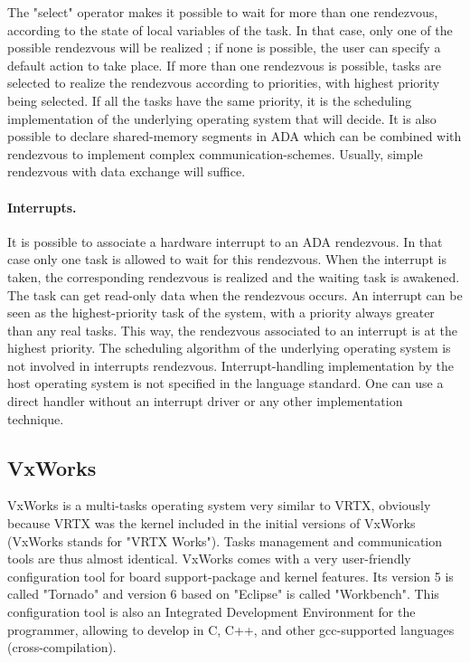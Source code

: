 \documentclass[10pt]{report}
\begin{document}
The "select" operator makes it possible to wait for more than one rendezvous, according to the state of local variables of the task.
In that case, only one of the possible rendezvous will be realized ; if none is possible, the user can specify a default action to take place. 
If more than one rendezvous is possible, tasks are selected to realize the rendezvous according to priorities, with highest priority being selected. 
If all the tasks have the same priority, it is the scheduling implementation of the underlying operating system
that will decide. It is also possible to declare shared-memory segments in ADA which can be combined with rendezvous to
implement complex communication-schemes. Usually, simple rendezvous with data exchange will suffice.

\paragraph{Interrupts.} It is possible to associate a hardware interrupt to an ADA rendezvous. In that case only one task is allowed
to wait for this rendezvous. When the interrupt is taken, the corresponding rendezvous is realized and the waiting
task is awakened. The task can get read-only data when the rendezvous occurs. An interrupt can be seen as the highest-priority 
task of the system, with a priority always greater than any real tasks. This way, the rendezvous associated to an interrupt is at the 
highest priority. The scheduling algorithm of the underlying operating system is not involved in interrupts rendezvous. Interrupt-handling
implementation by the host operating system is not specified in the language standard. One can use a direct handler without
an interrupt driver or any other implementation technique.

\subsection{VxWorks}

VxWorks is a multi-tasks operating system very similar to VRTX, obviously because VRTX was the kernel included in the initial versions 
of VxWorks (VxWorks stands for "VRTX Works"). Tasks management and communication tools are thus almost identical.
VxWorks comes with a very user-friendly configuration tool for board support-package and kernel features. Its version 5 is
called "Tornado" and version 6 based on "Eclipse" is called "Workbench". This configuration tool is also an
Integrated Development Environment for the programmer, allowing to develop in C, C++, and other gcc-supported languages (cross-compilation).
\end{document}
